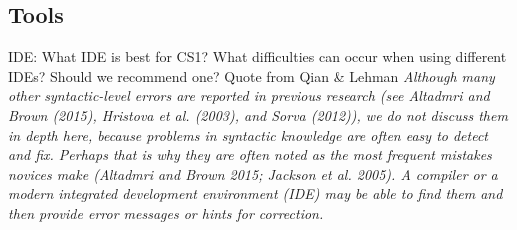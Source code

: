 \subsection{Tools}

IDE: What IDE is best for CS1? What difficulties can occur when using different IDEs? Should we recommend one? Quote from Qian \& Lehman \emph{Although many other syntactic-level errors are reported in previous research (see Altadmri and Brown (2015), Hristova et al. (2003), and Sorva (2012)), we do not discuss them in depth here, because problems in syntactic knowledge are often easy to detect and fix. Perhaps that is why they are often noted as the most frequent mistakes novices make (Altadmri and Brown 2015; Jackson et al. 2005). A compiler or a modern integrated development environment (IDE) may be able to find them and then provide error messages or hints for correction.}

